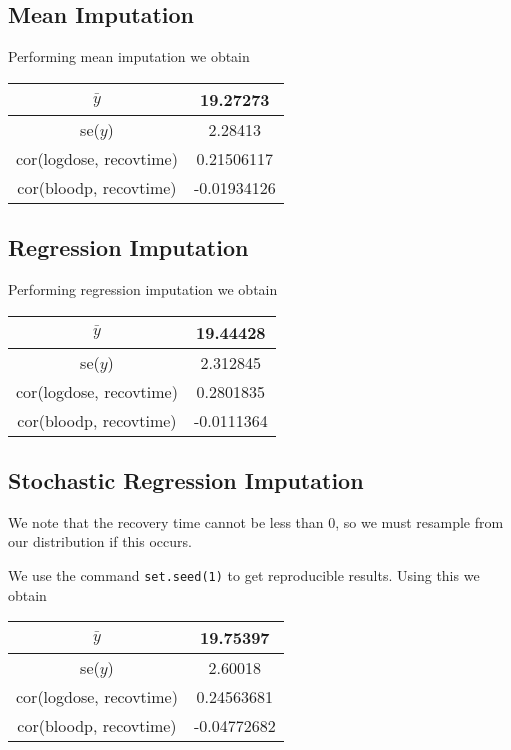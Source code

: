\documentclass[11pt]{article}
\begin{document}
\subsection*{Mean Imputation}

Performing mean imputation we obtain 

\begin{table}[H]
	\centering
	\begin{tabular}{|c|c|}
		\hline 
		$\bar{y}$ & 19.27273\\ 
		\hline 
		se($y$) & 2.28413\\ 
		\hline 
		cor(logdose, recovtime) & 0.21506117\\ 
		\hline 
		cor(bloodp, recovtime) & -0.01934126\\ 
		\hline 
	\end{tabular} 
\end{table}

\subsection*{Regression Imputation}

Performing regression imputation we obtain 

\begin{table}[H]
	\centering
	\begin{tabular}{|c|c|}
		\hline 
		$\bar{y}$ & 19.44428\\ 
		\hline 
		se($y$) & 2.312845\\ 
		\hline 
		cor(logdose, recovtime) & 0.2801835\\ 
		\hline 
		cor(bloodp, recovtime) & -0.0111364\\ 
		\hline 
	\end{tabular} 
\end{table}

\subsection*{Stochastic Regression Imputation}

We note that the recovery time cannot be less than 0, so we must resample from our distribution if this occurs.

We use the command \texttt{set.seed(1)} to get reproducible results. Using this we obtain

\begin{table}[H]
	\centering
	\begin{tabular}{|c|c|}
		\hline 
		$\bar{y}$ & 19.75397\\ 
		\hline 
		se($y$) & 2.60018\\ 
		\hline 
		cor(logdose, recovtime) & 0.24563681\\ 
		\hline 
		cor(bloodp, recovtime) & -0.04772682\\ 
		\hline 
	\end{tabular} 
\end{table}
\end{document}
